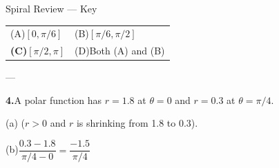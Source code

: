 \documentclass[10pt]{article}
\begin{document}
\begin{notesbox}{Spiral Review --- Key}
\vspace{4pt}
\begin{tabular}{ll}
(A)\quad $[0, \pi/6]$ \qquad\qquad & (B)\quad $[\pi/6, \pi/2]$ \\[4pt]
\textbf{(C)}\quad $[\pi/2, \pi]$ & (D)\quad Both (A) and (B) \\
\end{tabular}

\vspace{4pt}
 --- 

\vspace{0.14in}
\textbf{4.}\quad A polar function has $r = 1.8$ at $\theta = 0$ and $r = 0.3$
at $\theta = \pi/4$.

\vspace{4pt}
(a)\quad {} ($r > 0$ and $r$ is shrinking from 1.8 to 0.3).

\vspace{4pt}
(b)\quad $\dfrac{0.3 - 1.8}{\pi/4 - 0} = \dfrac{-1.5}{\pi/4}$ 

\end{notesbox}
\end{document}
